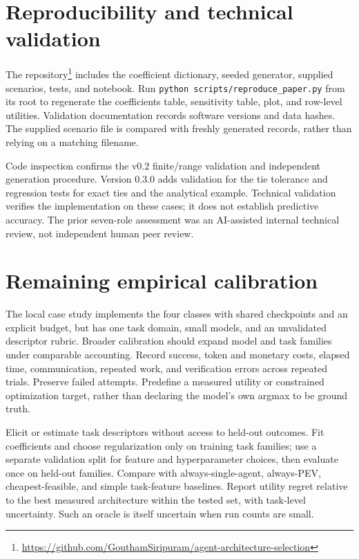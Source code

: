 \documentclass[11pt]{article}
\begin{document}
\section{Reproducibility and technical validation}
The repository\footnote{\url{https://github.com/GouthamSiripuram/agent-architecture-selection}} includes the coefficient dictionary, seeded generator, supplied scenarios, tests, and notebook. Run \texttt{python scripts/reproduce\_paper.py} from its root to regenerate the coefficients table, sensitivity table, plot, and row-level utilities. Validation documentation records software versions and data hashes. The supplied scenario file is compared with freshly generated records, rather than relying on a matching filename.

Code inspection confirms the v0.2 finite/range validation and independent generation procedure. Version 0.3.0 adds validation for the tie tolerance and regression tests for exact ties and the analytical example. Technical validation verifies the implementation on these cases; it does not establish predictive accuracy. The prior seven-role assessment was an AI-assisted internal technical review, not independent human peer review.

\section{Remaining empirical calibration}
The local case study implements the four classes with shared checkpoints and an explicit budget, but has one task domain, small models, and an unvalidated descriptor rubric. Broader calibration should expand model and task families under comparable accounting. Record success, token and monetary costs, elapsed time, communication, repeated work, and verification errors across repeated trials. Preserve failed attempts. Predefine a measured utility or constrained optimization target, rather than declaring the model's own argmax to be ground truth.

Elicit or estimate task descriptors without access to held-out outcomes. Fit coefficients and choose regularization only on training task families; use a separate validation split for feature and hyperparameter choices, then evaluate once on held-out families. Compare with always-single-agent, always-PEV, cheapest-feasible, and simple task-feature baselines. Report utility regret relative to the best measured architecture within the tested set, with task-level uncertainty. Such an oracle is itself uncertain when run counts are small.
\end{document}
